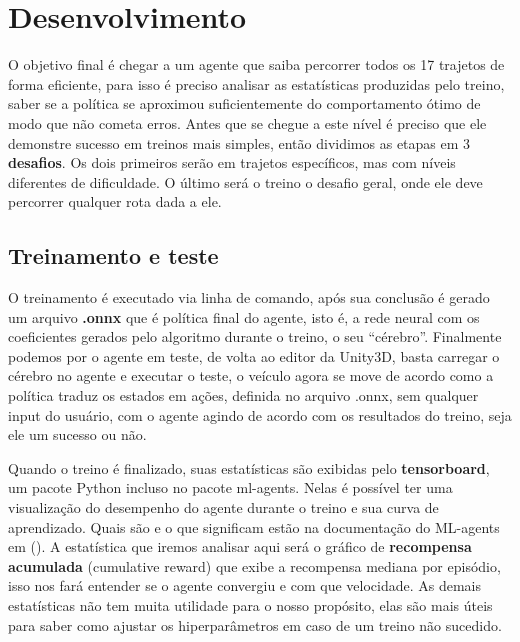 \section{Desenvolvimento}\label{metodologia}
O objetivo final é chegar a um agente que saiba percorrer todos os 17 trajetos de forma eficiente, para isso é preciso analisar as estatísticas produzidas pelo treino, saber se a política se aproximou suficientemente do comportamento ótimo de modo que não cometa erros. Antes que se chegue a este nível é preciso que ele demonstre sucesso em treinos mais simples, então dividimos as etapas em 3 \textbf{desafios}. Os dois primeiros serão em trajetos específicos, mas com níveis diferentes de dificuldade. O último será o treino o desafio geral, onde ele deve percorrer qualquer rota dada a ele.


\subsection{Treinamento e teste}
O treinamento é executado via linha de comando, após sua conclusão é gerado um arquivo \textbf{.onnx} que é política final do agente, isto é, a rede neural com os coeficientes gerados pelo algoritmo durante o treino, o seu ``cérebro''. Finalmente podemos por o agente em teste, de volta ao editor da Unity3D, basta carregar o cérebro no agente e executar o teste, o veículo agora se move de acordo como a política traduz os estados em ações, definida no arquivo .onnx, sem qualquer input do usuário, com o agente agindo de acordo com os resultados do treino, seja ele um sucesso ou não. 

Quando o treino é finalizado, suas estatísticas são exibidas pelo \textbf{tensorboard}, um pacote Python incluso no pacote ml-agents. Nelas é possível ter uma visualização do desempenho do agente durante o treino e sua curva de aprendizado. Quais são e o que significam estão na documentação do ML-agents em (). A estatística que iremos analisar aqui será o gráfico de \textbf{recompensa acumulada} (cumulative reward) que exibe a recompensa mediana por episódio, isso nos fará entender se o agente convergiu e com que velocidade. As demais estatísticas não tem muita utilidade para o nosso propósito, elas são mais úteis para saber como ajustar os hiperparâmetros em caso de um treino não sucedido.

